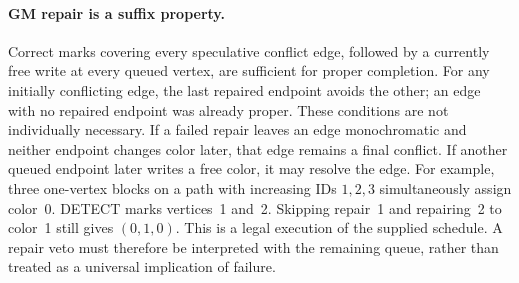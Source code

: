 \paragraph{GM repair is a suffix property.}
Correct marks covering every speculative conflict edge, followed by a
currently free write at every queued vertex, are sufficient for proper
completion. For any initially conflicting edge, the last repaired endpoint
avoids the other; an edge with no repaired endpoint was already proper.
These conditions are not individually necessary. If a failed repair leaves
an edge monochromatic and neither endpoint changes color later, that edge
remains a final conflict. If another queued endpoint later writes a free
color, it may resolve the edge. For example, three one-vertex blocks on a
path with increasing IDs $1,2,3$ simultaneously assign color~0. DETECT marks
vertices~1 and~2. Skipping repair~1 and repairing~2 to color~1 still gives
$(0,1,0)$. This is a legal execution of the supplied schedule. A repair veto
must therefore be interpreted with the remaining queue, rather than treated
as a universal implication of failure.
